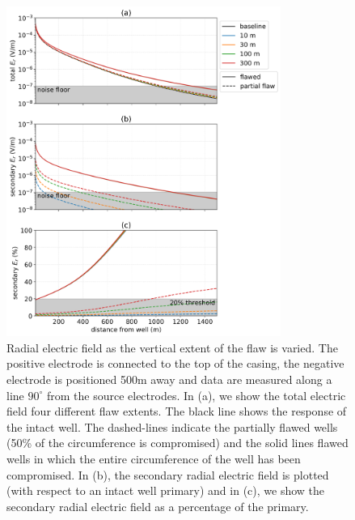 \begin{figure}
    \begin{center}
    \includegraphics[width=0.8\textwidth]{figures/integrity_partial_flaw.png}
    \end{center}
\caption{
    Radial electric field as the vertical extent of the flaw is varied.
    The positive electrode is connected to the top of the casing, the negative electrode
    is positioned 500m away and data are measured along a line $90^\circ$ from the
    source electrodes. In (a), we show the total electric field four different flaw extents.
    The black line shows the response of the intact well.
    The dashed-lines indicate the partially flawed wells (50\% of the circumference is compromised)
    and the solid lines flawed wells in which the entire circumference of the well has been compromised.
    In (b), the secondary radial electric field is plotted (with respect to an intact well primary)
    and in (c), we show the secondary radial electric field as a percentage of the primary.
}
\label{fig:integrity_partial_flaw}
\end{figure}
